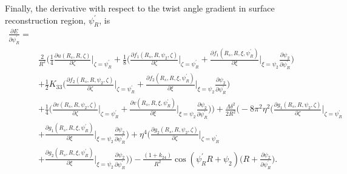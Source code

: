 \documentclass[12pt]{article}
\begin{document}
Finally, the derivative with respect to the twist angle gradient in surface reconstruction region, $\psi_R^{\prime}$, is
\begin{align}
\frac{\partial E}{\partial \psi_R^{\prime}}=&\nonumber\\
&\frac{2}{R^2}\bigg(\frac{1}{4}\frac{\partial u(R_s,R,\zeta)}{\partial\zeta}\bigg|_{\zeta=\psi_R^{\prime}}+\frac{1}{8}\bigg(\frac{\partial f_1(R_s,R,\psi_2,\zeta)}{\partial\zeta}\bigg|_{\zeta=\psi_R^{\prime}}+\frac{\partial f_1(R_s,R,\xi,\psi_R^{\prime})}{\partial\xi}\bigg|_{\xi=\psi_2}\frac{\partial\psi_2}{\partial\psi_R^{\prime}}\bigg)\nonumber\\
&+\frac{1}{2}K_{33}\bigg(\frac{\partial f_2(R_s,R,\psi_2,\zeta)}{\partial\zeta}\bigg|_{\zeta=\psi_R^{\prime}}+\frac{\partial f_2(R_s,R,\xi,\psi_R^{\prime})}{\partial\xi}\bigg|_{\xi=\psi_2}\frac{\partial\psi_2}{\partial\psi_R^{\prime}}\bigg)\nonumber\\
&+\frac{1}{4}\bigg(\frac{\partial v(R_s,R,\psi_2,\zeta)}{\partial\zeta}\bigg|_{\zeta=\psi_R^{\prime}}+\frac{\partial v(R_s,R,\xi,\psi_R^{\prime})}{\partial\xi}\bigg|_{\xi=\psi_2}\frac{\partial\psi_2}{\partial\psi_R^{\prime}}\bigg)\bigg)+\frac{\Lambda\delta^2}{2R^2}\bigg(-8\pi^2\eta^2\bigg(\frac{\partial g_1(R_s,R,\psi_2,\zeta)}{\partial\zeta}\bigg|_{\zeta=\psi_R^{\prime}}\nonumber\\
&+\frac{\partial g_1(R_s,R,\xi,\psi_R^{\prime})}{\partial\xi}\bigg|_{\xi=\psi_2}\frac{\partial\psi_2}{\partial\psi_R^{\prime}}\bigg)+\eta^4\bigg(\frac{\partial g_2(R_s,R,\psi_2,\zeta)}{\partial\zeta}\bigg|_{\zeta=\psi_R^{\prime}}\nonumber\\
&+\frac{\partial g_2(R_s,R,\xi,\psi_R^{\prime})}{\partial\xi}\bigg|_{\xi=\psi_2}\frac{\partial\psi_2}{\partial\psi_R^{\prime}}\bigg)\bigg)-\frac{(1+k_{24})}{R^2}\cos(\psi_R^{\prime}R+\psi_2)\bigg(R+\frac{\partial\psi_2}{\partial\psi_R^{\prime}}\bigg).\label{eq:dEdpsi_Rc}
\end{align}
\end{document}
